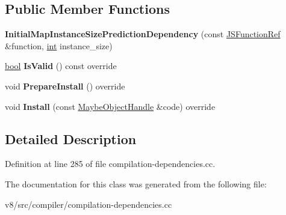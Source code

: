\subsection*{Public Member Functions}
\begin{DoxyCompactItemize}
\item 
\mbox{\label{classv8_1_1internal_1_1compiler_1_1InitialMapInstanceSizePredictionDependency_ae6dc9f0c3c59047ab34ad00ffbde8b5e}} 
{\bfseries Initial\+Map\+Instance\+Size\+Prediction\+Dependency} (const \mbox{\hyperlink{classv8_1_1internal_1_1compiler_1_1JSFunctionRef}{J\+S\+Function\+Ref}} \&function, \mbox{\hyperlink{classint}{int}} instance\+\_\+size)
\item 
\mbox{\label{classv8_1_1internal_1_1compiler_1_1InitialMapInstanceSizePredictionDependency_ad20f46bc2229935b3ce472ca337239a8}} 
\mbox{\hyperlink{classbool}{bool}} {\bfseries Is\+Valid} () const override
\item 
\mbox{\label{classv8_1_1internal_1_1compiler_1_1InitialMapInstanceSizePredictionDependency_a2afa2df0d080dd332ec521bcfc5ffd07}} 
void {\bfseries Prepare\+Install} () override
\item 
\mbox{\label{classv8_1_1internal_1_1compiler_1_1InitialMapInstanceSizePredictionDependency_aedebdc4e5f0bfb94965010bde601567b}} 
void {\bfseries Install} (const \mbox{\hyperlink{classv8_1_1internal_1_1MaybeObjectHandle}{Maybe\+Object\+Handle}} \&code) override
\end{DoxyCompactItemize}


\subsection{Detailed Description}


Definition at line 285 of file compilation-\/dependencies.\+cc.



The documentation for this class was generated from the following file\+:\begin{DoxyCompactItemize}
\item 
v8/src/compiler/compilation-\/dependencies.\+cc\end{DoxyCompactItemize}
